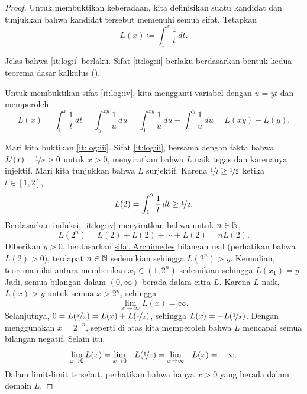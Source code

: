 \begin{proof}
Untuk membuktikan keberadaan, kita definisikan suatu kandidat dan tunjukkan bahwa kandidat tersebut memenuhi
semua sifat.  Tetapkan
\begin{equation*}
L(x) \coloneqq \int_1^x \frac{1}{t}\,dt .
\end{equation*}

Jelas bahwa \ref{it:log:i} berlaku.  Sifat \ref{it:log:ii} berlaku
berdasarkan bentuk kedua teorema dasar kalkulus
().

Untuk membuktikan sifat \ref{it:log:iv},
kita mengganti variabel dengan $u=yt$ dan memperoleh
\begin{equation*}
L(x) =
\int_1^{x} \frac{1}{t}\,dt
=
\int_y^{xy} \frac{1}{u}\,du
=
\int_1^{xy} \frac{1}{u}\,du
-
\int_1^{y} \frac{1}{u}\,du
=
L(xy)-L(y) .
\end{equation*}

Mari kita buktikan \ref{it:log:iii}.
Sifat \ref{it:log:ii}, bersama dengan fakta bahwa $L'(x) = \nicefrac{1}{x} > 0$
untuk $x > 0$, menyiratkan bahwa $L$
naik tegas dan karenanya injektif.
Mari kita tunjukkan bahwa $L$ surjektif.
Karena $\nicefrac{1}{t} \geq \nicefrac{1}{2}$ ketika $t \in [1,2]$,
\begin{equation*}
L(2) = \int_1^2 \frac{1}{t} \,dt \geq \nicefrac{1}{2} .
\end{equation*}
Berdasarkan induksi, \ref{it:log:iv} menyiratkan bahwa untuk $n \in {\mathbb{N}}$,
\begin{equation*}
L(2^n) = L(2) + L(2) + \cdots + L(2) = n L(2) .
\end{equation*}
Diberikan $y > 0$,
berdasarkan \hyperref[thm:arch:i]{sifat Archimedes} bilangan real
(perhatikan bahwa $L(2) > 0$), terdapat $n \in {\mathbb{N}}$ sedemikian sehingga
$L(2^n) > y$.  Kemudian,
\hyperref[IVT:thm]{teorema nilai antara}
memberikan $x_1 \in (1,2^n)$ sedemikian sehingga $L(x_1) = y$.  Jadi,
semua bilangan dalam $(0,\infty)$ berada dalam citra $L$.
Karena $L$ naik, $L(x) > y$ untuk semua $x > 2^n$, sehingga
\begin{equation*}
\lim_{x\to\infty} L(x) = \infty .
\end{equation*}
Selanjutnya,
$0 = L(\nicefrac{x}{x}) = L(x) + L(\nicefrac{1}{x})$, sehingga
$L(x) = - L(\nicefrac{1}{x})$.  Dengan menggunakan $x=2^{-n}$, seperti di atas kita memperoleh
bahwa $L$ mencapai semua bilangan negatif.  Selain itu,
\begin{equation*}
\lim_{x \to 0} L(x) = 
\lim_{x \to 0} -L(\nicefrac{1}{x})
=
\lim_{x \to \infty} -L(x)
=  - \infty .
\end{equation*}
Dalam limit-limit tersebut, perhatikan bahwa hanya $x > 0$ yang berada dalam domain $L$.


\end{proof}
